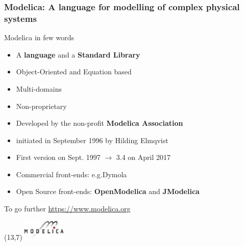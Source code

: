 
\begin{frame}
  \frametitle{Modelica: A language for modelling of complex physical systems}
  Modelica in few words
  \begin{itemize}
  \item A \textbf{language} and a \textbf{Standard Library}
  \item Object-Oriented and Equation based
  \item Multi-domains
  \item Non-proprietary
  \item Developed by the non-profit \textbf{Modelica Association}
  \item initiated in September 1996 by Hilding Elmqvist
  \item First version on Sept. 1997  $\rightarrow$ 3.4 on April 2017
  \item Commercial front-ends: e.g.\@ Dymola
  \item Open Source front-ends: \textbf{OpenModelica} and \textbf{JModelica} \\[1em]
  \end{itemize}
  {\tiny To go further \url{https://www.modelica.org}}
  \begin{textblock}{6}(13,7)
    \includegraphics[width=2cm]{images/modelica-logo.jpg}
  \end{textblock}
\end{frame}

